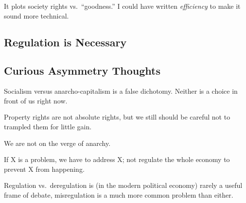 It plots society rights vs.\ ``goodness.'' I could have written
\emph{efficiency} to make it sound more technical.

\subsection{Regulation is Necessary}



\subsection{Curious Asymmetry Thoughts}

\thought Socialism versus anarcho-capitalism is a false dichotomy. Neither is a
choice in front of us right now.

\thought Property rights are not absolute rights, but we still should be
careful not to trampled them for little gain.

\thought We are not on the verge of anarchy.

\thought If X is a problem, we have to address X; not regulate the whole
economy to prevent X from happening.

\thought Regulation vs.\ deregulation is (in the modern political economy)
rarely a useful frame of debate, misregulation is a much more common problem
than either.

